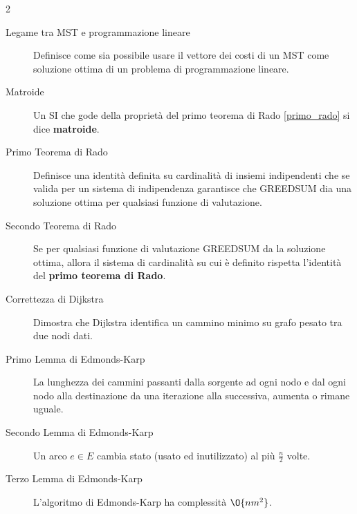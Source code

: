 \documentclass[\main/main.tex]{subfiles}
\begin{document}
\begin{multicols}{2}
\begin{description}
		\item[Legame tra MST e programmazione lineare] Definisce come sia possibile usare il vettore dei costi di un MST come soluzione ottima di un problema di programmazione lineare.
		\item[Matroide] Un SI che gode della proprietà del primo teorema di Rado \ref{primo_rado} si dice \textbf{matroide}.
		\item[Primo Teorema di Rado] Definisce una identità definita su cardinalità di insiemi indipendenti che se valida per un sistema di indipendenza garantisce che GREEDSUM dia una soluzione ottima per qualsiasi funzione di valutazione.
		\item[Secondo Teorema di Rado] Se per qualsiasi funzione di valutazione GREEDSUM da la soluzione ottima, allora il sistema di cardinalità su cui è definito rispetta l'identità del \textbf{primo teorema di Rado}.
		\item[Correttezza di Dijkstra] Dimostra che Dijkstra identifica un cammino minimo su grafo pesato tra due nodi dati.
		\item[Primo Lemma di Edmonds-Karp] La lunghezza dei cammini passanti dalla sorgente ad ogni nodo e dal ogni nodo alla destinazione da una iterazione alla successiva, aumenta o rimane uguale.
		\item[Secondo Lemma di Edmonds-Karp] Un arco \(e \in E\) cambia stato (usato ed inutilizzato) al più \(\frac{n}{2}\) volte.
		\item[Terzo Lemma di Edmonds-Karp] L'algoritmo di Edmonds-Karp ha complessità \(\O{nm^2}\).
	\end{description}
\end{multicols}
\end{document}
